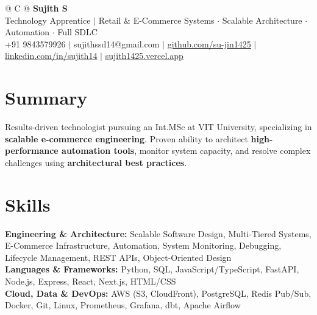 \documentclass[a4paper,10pt]{article}
\newcommand{\ulink}[2]{\href{#1}{\uline{#2}}}
\begin{document}
\pagestyle{empty}

\begin{tabularx}{\linewidth}{@{} C @{}}
{\color[HTML]{000000}\fontsize{30}{35}\selectfont\bfseries Sujith S} \\[5pt]
{\fontsize{10.5}{12.5}\selectfont\color[HTML]{3A3A3A}
Technology Apprentice $|$ Retail \& E-Commerce Systems $\cdot$ Scalable Architecture $\cdot$ Automation $\cdot$ Full SDLC} \\[6pt]
{\fontsize{9.5}{11.5}\selectfont\textcolor[HTML]{3A3A3A}{+91 9843579926 $|$ sujithssd14@gmail.com $|$ \ulink{https://github.com/su-jin1425}{github.com/su-jin1425} $|$ \ulink{https://linkedin.com/in/sujith14}{linkedin.com/in/sujith14} $|$ \ulink{https://sujith1425.vercel.app}{sujith1425.vercel.app}}}
\end{tabularx}

\vspace{2pt}

\section{Summary}
\vspace{3pt}
{\color[HTML]{0A0A0A}\fontsize{11}{14}\selectfont
Results-driven technologist pursuing an Int.MSc at VIT University, specializing in \textbf{scalable e-commerce engineering}. Proven ability to architect \textbf{high-performance automation tools}, monitor system capacity, and resolve complex challenges using \textbf{architectural best practices}.}

\vspace{2pt}

\section{Skills}
\vspace{3pt}
{\color[HTML]{0A0A0A}\fontsize{11}{14}\selectfont
\textbf{Engineering \& Architecture:} Scalable Software Design, Multi-Tiered Systems, E-Commerce Infrastructure, Automation, System Monitoring, Debugging, Lifecycle Management, REST APIs, Object-Oriented Design \\[2pt]
\textbf{Languages \& Frameworks:} Python, SQL, JavaScript/TypeScript, FastAPI, Node.js, Express, React, Next.js, HTML/CSS \\[2pt]
\textbf{Cloud, Data \& DevOps:} AWS (S3, CloudFront), PostgreSQL, Redis Pub/Sub, Docker, Git, Linux, Prometheus, Grafana, dbt, Apache Airflow}
\end{document}
